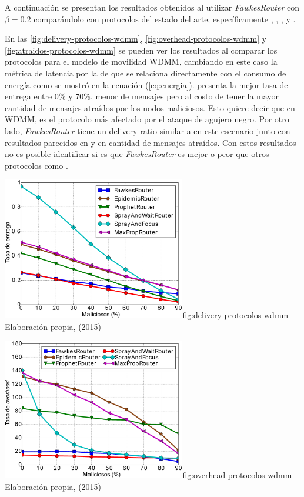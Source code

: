 A continuación se presentan los resultados obtenidos al utilizar
\textit{FawkesRouter} con $\beta = 0.2$ comparándolo con protocolos del estado
del arte, específicamente \epidemic, \prophet, \syw, \syf{} y \maxprop.


En las \ref{fig:delivery-protocolos-wdmm}, \ref{fig:overhead-protocolos-wdmm} y
\ref{fig:atraidos-protocolos-wdmm} se pueden ver los resultados al comparar los
protocolos para el modelo de movilidad WDMM, cambiando en este caso la métrica
de latencia por la de \overhead{} que se relaciona directamente con el consumo
de energía como se mostró en la ecuación (\ref{eq:energia}). \syf{}
presenta la mejor tasa de entrega entre 0\% y 70\%, menor \overhead{} de
mensajes pero al costo de tener la mayor cantidad de mensajes atraídos por los
nodos maliciosos. Esto quiere decir que en WDMM, \syf{} es el protocolo más
afectado por el ataque de agujero negro. Por otro lado, \textit{FawkesRouter}
tiene un delivery ratio similar a \syw{} en este escenario junto con resultados
parecidos en \overhead{} y en cantidad de mensajes atraídos. Con estos
resultados no es posible identificar si es que \textit{FawkesRouter} es mejor o
peor que otros protocolos como \syw.






{\includegraphics[width=0.6\textwidth]{imagenes/seguridad/graficos/delivery_comparacion.eps}}{fig:delivery-protocolos-wdmm}
{Elaboración propia, (2015)}

{\includegraphics[width=0.6\textwidth]{imagenes/seguridad/graficos/overhead_comparacion.eps}}{fig:overhead-protocolos-wdmm}
{Elaboración propia, (2015)}

